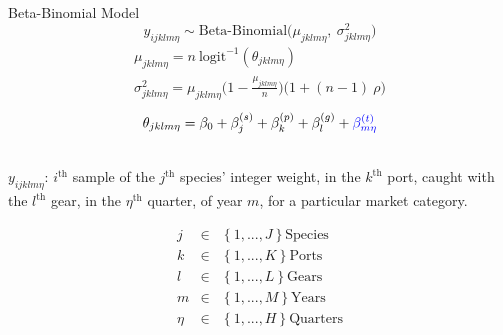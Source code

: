 \documentclass[ xcolor = pdftex, dvipsnames, table ]{beamer}
\begin{document}
\subsection{}
\begin{frame}{Beta-Binomial Model}
\vspace{-0.5cm}
\begin{equation*}
        y_{ijklm\eta} \sim \text{Beta-Binomial}\Big(\mu_{jklm\eta},~\sigma^2_{jklm\eta} \Big)
\end{equation*}
\vspace{-0.7cm}
\begin{gather*}
        \mu_{jklm\eta} = n~\text{logit}^{-1}(\theta_{jklm\eta})\\
        \sigma^2_{jklm\eta} = \mu_{jklm\eta}\Big(1-\frac{\mu_{jklm\eta}}{n}\Big)\Big(1+(n-1)~\rho\Big)
\end{gather*}
\vspace{-0.2cm}
\begin{equation*}
        \theta_{jklm\eta} = \beta_0 + \beta^{(s)}_j + \beta^{(p)}_k + \beta^{(g)}_l + \color{blue}{\beta^{(t)}_{m\eta}}%
\end{equation*}
\hspace{-0.5cm}
\begin{minipage}[h!]{0.55\textwidth}
        $~$\\
        $y_{ijklm\eta}$: $i^{\text{th}}$ sample of the $j^{\text{th}}$ species' integer weight, in the $k^{\text{th}}$ port, caught with the $l^{\text{th}}$ gear, in the $\eta^{\text{th}}$ \mbox{quarter,} of year $m$, for a particular market \mbox{category.}
\end{minipage}
\begin{minipage}{0.45\textwidth}
        \vspace{-0.5cm}
        \hspace{4cm}
        \begin{eqnarray*}
        j &\in&\left\{1, ..., J\right\} \text{Species}\\
        k &\in&\left\{1, ..., K\right\} \text{Ports}\\
        l &\in&\left\{1, ..., L\right\} \text{Gears}\\
        m &\in&\left\{1, ..., M\right\} \text{Years}\\
        \eta &\in&\left\{1, ..., H\right\} \text{Quarters}
        \end{eqnarray*}
\end{minipage}
\end{frame}
\end{document}
